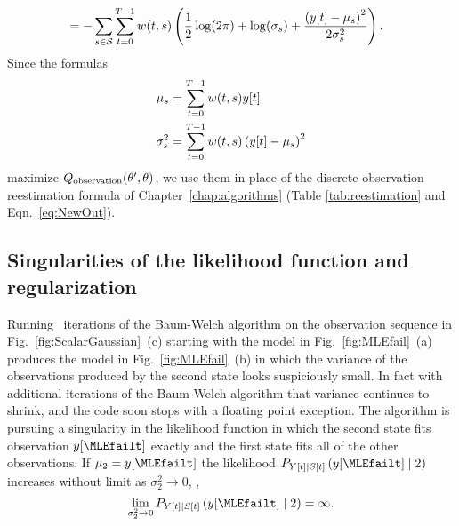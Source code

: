 \begin{description}
\begin{align}
  \label{eq:QoutG3}
  &= - \sum_{s\in\states} \sum_{t=0}^{T-1} w(t,s) \left( \frac{1}{2}
    \log(2\pi) + \log(\sigma_s) + \frac{\left( \ti{y}{t}-\mu_s
      \right)^2}{2\sigma_s^2} \right).
\end{align}
Since the formulas
\begin{align}
  \label{eq:NewMuG}
  \mu_s &= \sum_{t=0}^{T-1} w(t,s) {y}{[t]} \\
  \sigma_s^2 &= \sum_{t=0}^{T-1} w(t,s)\left( {y}{[t]}-\mu_s \right)^2
\end{align}
maximize $Q_{\text{observation}} (\theta',\theta)$, we use them in place
of the discrete observation reestimation formula of
Chapter~\ref{chap:algorithms} (Table \ref{tab:reestimation} and
Eqn.~\eqref{eq:NewOut}).
%
\end{description}


\subsection{Singularities of the likelihood function and regularization}
\label{sec:regularization}

Running \MLEfailIterations~iterations of the Baum-Welch algorithm on
the observation sequence in Fig.~\ref{fig:ScalarGaussian}~(c) starting
with the model in Fig.~\ref{fig:MLEfail}~(a) produces the model in
Fig.~\ref{fig:MLEfail}~(b) in which the variance of the observations
produced by the second state looks suspiciously small.  In fact with
additional iterations of the Baum-Welch algorithm that variance
continues to shrink, and the code soon stops with a floating point
exception.  The algorithm is pursuing a singularity in the likelihood
function in which the second state fits observation
$\ti{y}{\MLEfailt}$ exactly and the first state fits all of the other
observations.  If $\mu_2 = \ti{y}{\MLEfailt}$ the likelihood
$P_{\ti{Y}{t}\given \ti{S}{t}} \left(\ti{y}{\MLEfailt}\given 2 \right)$ increases
without limit as $\sigma^2_2 \rightarrow 0$, \ie,
\begin{equation*}
  \lim_{\sigma^2_2 \rightarrow 0} P_{\ti{Y}{t}\given \ti{S}{t}}
  \left(\ti{y}{\MLEfailt}\given 2 \right) = \infty.
\end{equation*}

